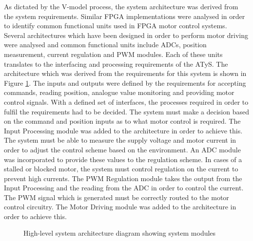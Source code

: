 As dictated by the V-model process, the system architecture was derived from the system requirements. Similar FPGA implementations were analysed in order to identify common functional units used in FPGA motor control systems. Several architectures which have been designed in order to perform motor driving were analysed and common functional units include ADCs, position measurement, current regulation and PWM modules\cite{Jeppesen, MonmassonFPGABasedControllers, Dubey, Idkhajine, Aime}. Each of these units translates to the interfacing and processing requirements of the ATyS. The architecture which was derived from the requirements for this system is shown in Figure \ref{sys_architecture}. The inputs and outputs were defined by the requirements for accepting commands, reading position, analogue value monitoring and providing motor control signals. With a defined set of interfaces, the processes required in order to fulfil the requirements had to be decided. The system must make a decision based on the command and position inputs as to what motor control is required. The Input Processing module was added to the architecture in order to achieve this. The system must be able to measure the supply voltage and motor current in order to adjust the control scheme based on the environment. An ADC module was incorporated to provide these values to the regulation scheme.
In cases of a stalled or blocked motor, the system must control regulation on the current to prevent high currents. The PWM Regulation module takes the output from the Input Processing and the reading from the ADC in order to control the current. The PWM signal which is generated must be correctly routed to the motor control circuitry. The Motor Driving module was added to the architecture in order to achieve this. 



\begin{figure}
    \centering
    
    \caption{High-level system architecture diagram showing system modules}
    \label{sys_architecture}
\end{figure}



